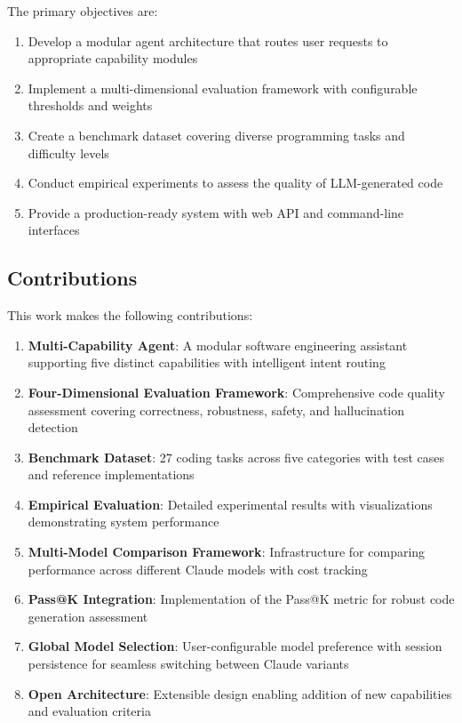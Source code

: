 \documentclass[12pt,a4paper]{article}
\begin{document}
The primary objectives are:
\begin{enumerate}
    \item Develop a modular agent architecture that routes user requests to appropriate capability modules
    \item Implement a multi-dimensional evaluation framework with configurable thresholds and weights
    \item Create a benchmark dataset covering diverse programming tasks and difficulty levels
    \item Conduct empirical experiments to assess the quality of LLM-generated code
    \item Provide a production-ready system with web API and command-line interfaces
\end{enumerate}

\subsection{Contributions}

This work makes the following contributions:
\begin{enumerate}
    \item \textbf{Multi-Capability Agent}: A modular software engineering assistant supporting five distinct capabilities with intelligent intent routing
    \item \textbf{Four-Dimensional Evaluation Framework}: Comprehensive code quality assessment covering correctness, robustness, safety, and hallucination detection
    \item \textbf{Benchmark Dataset}: 27 coding tasks across five categories with test cases and reference implementations
    \item \textbf{Empirical Evaluation}: Detailed experimental results with visualizations demonstrating system performance
    \item \textbf{Multi-Model Comparison Framework}: Infrastructure for comparing performance across different Claude models with cost tracking
    \item \textbf{Pass@K Integration}: Implementation of the Pass@K metric for robust code generation assessment
    \item \textbf{Global Model Selection}: User-configurable model preference with session persistence for seamless switching between Claude variants
    \item \textbf{Open Architecture}: Extensible design enabling addition of new capabilities and evaluation criteria
\end{enumerate}
\end{document}
